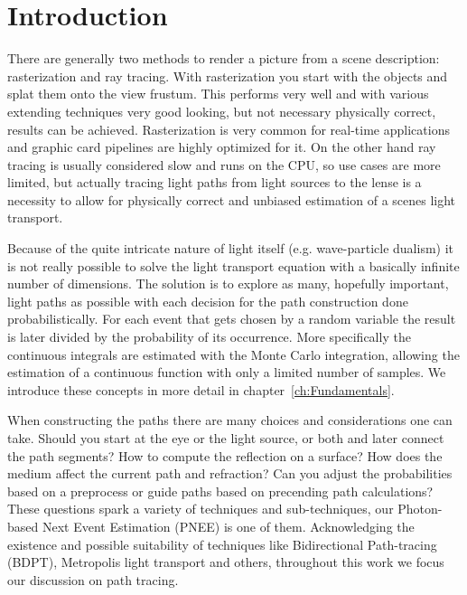 \chapter{Introduction}
\label{ch:Introduction}

There are generally two methods to render a picture from a scene description: rasterization and ray tracing. With rasterization you start with the objects and splat them onto the view frustum. This performs very well and with various extending techniques very good looking, but not necessary physically correct, results can be achieved.  Rasterization is very common for real-time applications and graphic card pipelines are highly optimized for it. On the other hand ray tracing is usually considered slow and runs on the CPU, so use cases are more limited, but actually tracing light paths from light sources to the lense is a necessity to allow for physically correct and unbiased estimation of a scenes light transport. 

Because of the quite intricate nature of light itself (e.g. wave-particle dualism) it is not really possible to solve the light transport equation with a basically infinite number of dimensions. The solution is to explore as many, hopefully important, light paths as possible with each decision for the path construction done probabilistically. For each event that gets chosen by a random variable the result is later divided by the probability of its occurrence. More specifically the continuous integrals are estimated with the Monte Carlo integration, allowing the estimation of a continuous function with only a limited number of samples. We introduce these concepts in more detail in chapter~\ref{ch:Fundamentals}.

When constructing the paths there are many choices and considerations one can take. Should you start at the eye or the light source, or both and later connect the path segments? How to compute the reflection on a surface? How does the medium affect the current path and refraction? Can you adjust the probabilities based on a preprocess or guide paths based on precending path calculations?
These questions spark a variety of techniques and sub-techniques, our Photon-based Next Event Estimation (PNEE) is one of them. Acknowledging the existence and possible suitability of techniques like Bidirectional Path-tracing (BDPT), Metropolis light transport and others, throughout this work we focus our discussion on path tracing.

